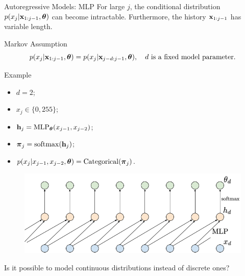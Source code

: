 \documentclass{beamer}
\begin{document}
\begin{frame}{Autoregressive Models: MLP}
	For large $j$, the conditional distribution $p(x_j | \mathbf{x}_{1:j - 1}, \boldsymbol{\theta})$ can become intractable. Furthermore, the history $\mathbf{x}_{1:j-1}$ has variable length.
	\begin{block}{Markov Assumption}
		\vspace{-0.5cm}
		$$
			p(x_j | \mathbf{x}_{1:j - 1}, \boldsymbol{\theta}) = p(x_j | \mathbf{x}_{j - d:j - 1}, \boldsymbol{\theta}), \quad d \text{ is a fixed model parameter}.
		$$
	\end{block}
	\vspace{-0.5cm}
	\begin{block}{Example}
		\begin{minipage}[t]{0.39\columnwidth}
			{\small
			\begin{itemize}
				\item $d = 2$;
				\item $x_j \in \{0, 255\}$;
				\item $\mathbf{h}_j = \mathrm{MLP}_{\boldsymbol{\theta}}(x_{j - 1}, x_{j - 2})$;
				\item $\boldsymbol{\pi}_j = \mathrm{softmax}(\mathbf{h}_j)$;
				\item $p(x_j | x_{j - 1}, x_{j - 2}, \boldsymbol{\theta}) = \mathrm{Categorical}(\boldsymbol{\pi}_j)$.
			\end{itemize}
			}
		\end{minipage}%
		\begin{minipage}[t]{0.61\columnwidth}
			 \begin{figure}
			   \centering
			   \includegraphics[width=1.0\linewidth]{figs/sequential_MLP}
			 \end{figure}
			 Is it possible to model continuous distributions instead of discrete ones?
		\end{minipage}
	\end{block}
\end{frame}
\end{document}
